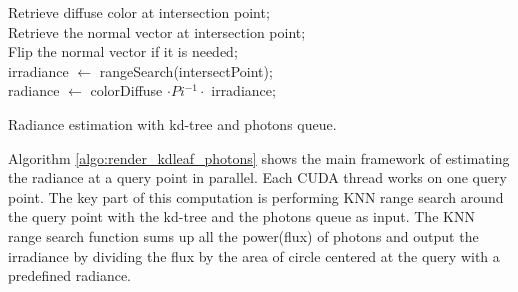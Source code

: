 \begin{algorithm}
	\SetAlgoLined
	
	 {
		Retrieve diffuse color at intersection point; \\
		Retrieve the normal vector at intersection point; \\
		Flip the normal vector if it is needed; \\
		irradiance \(\leftarrow\) rangeSearch(intersectPoint); \\
		radiance \(\leftarrow\) colorDiffuse \( \cdot Pi^{-1} \cdot\) irradiance; \\ 	
	}
	\caption{Radiance estimation with kd-tree and photons queue.} 	
	\label{algo:render_kdleaf_photons}
\end{algorithm}

Algorithm \ref{algo:render_kdleaf_photons} shows the main framework of estimating the radiance at a query point in parallel. Each CUDA thread works on one query point. The key part of this computation is performing KNN range search around the query point with the kd-tree and the photons queue as input. The KNN range search function sums up all the power(flux) of photons and output the irradiance by dividing the flux by the area of circle centered at the query with a predefined radiance.

